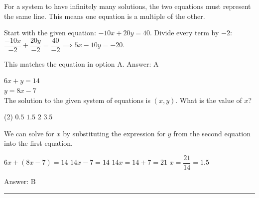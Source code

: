 \documentclass[11pt,paper=a4,answers]{exam}
\begin{document}
\begin{questions}
\begin{solution}
For a system to have infinitely many solutions, the two equations must represent the same line. This means one equation is a multiple of the other.
\vspace{5pt}
\begin{center}
Start with the given equation: $-10x + 20y = 40$.
\vspace{5pt}
Divide every term by $-2$:
\vspace{5pt}
$\dfrac{-10x}{-2} + \dfrac{20y}{-2} = \dfrac{40}{-2} \implies 5x - 10y = -20$.
\end{center}
\vspace{5pt}
This matches the equation in option A.
\vspace{5pt}
Answer: \colorbox{yellow!100}{A}
\end{solution}

\vspace{1cm}

\question
$6x + y = 14$ \\
$y = 8x - 7$ \\
The solution to the given system of equations is $(x, y)$. What is the value of $x$?
\begin{tasks}(2)
\task $0.5$
\task $1.5$
\task $2$
\task $3.5$
\end{tasks}

\begin{solution}
We can solve for $x$ by substituting the expression for $y$ from the second equation into the first equation.
\vspace{5pt}
\begin{center}
$6x + (8x - 7) = 14$
\vspace{5pt}
$14x - 7 = 14$
\vspace{5pt}
$14x = 14 + 7 = 21$
\vspace{5pt}
$x = \dfrac{21}{14} = 1.5$
\end{center}
\vspace{5pt}
Answer: \colorbox{yellow!100}{B}
\end{solution}

\end{questions}
\begin{center}
\rule{.5\textwidth}{1pt}
\end{center}
\end{document}
